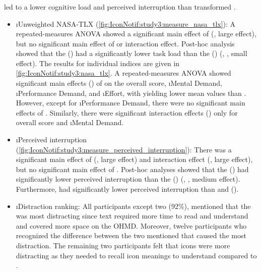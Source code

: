 \subsubsection*{\Interruption{}}
\label{sec:IconNotif:study3:interruption_parameter}

 led to a lower cognitive load and perceived interruption than transformed .

\begin{itemize}
    \item \i{Unweighted NASA-TLX} (\autoref{fig:IconNotif:study3:measure_nasa_tlx}): A repeated-measures ANOVA showed a significant main effect of \format{} (, large effect), but no significant main effect of \complexity{} or interaction effect. Post-hoc analysis showed that the \iconformat{} () had a significantly lower task load than the \textformat{} () (, , small effect). The results for individual indices are given in \autoref{fig:IconNotif:study3:nasa_tlx}. A repeated-measures ANOVA showed significant main effects () of \format{} on the overall score, \i{Mental Demand}, \i{Performance Demand}, and \i{Effort}, with \iconformat{} yielding lower mean values than \textformat{}. However, except for \i{Performance Demand}, there were no significant main effects of \complexity{}. Similarly, there were significant interaction effects () only for overall score and \i{Mental Demand}.
    
    \item \i{Perceived interruption} (\autoref{fig:IconNotif:study3:measure_perceived_interruption}): There was a significant main effect of \format{} (, large effect) and interaction effect (, large effect), but no significant main effect of \complexity{}. Post-hoc analyses showed that the \iconformat{} () had significantly lower perceived interruption than the \textformat{} () (, , medium effect). Furthermore, \iconmulti{} had significantly lower perceived interruption than \textsingle{} and \textmulti{} ().
    
    \item \i{Distraction ranking}: All participants except two (92\%), mentioned that the \textformat{} was most distracting since text required more time to read and understand and covered more space on the OHMD. Moreover, twelve participants who recognized the difference between the two  mentioned that \textmulti{} caused the most distraction. The remaining two participants felt that icons were more distracting as they needed to recall icon meanings to understand \iconformat{} compared to \textformat{}.
    
    
\end{itemize}

